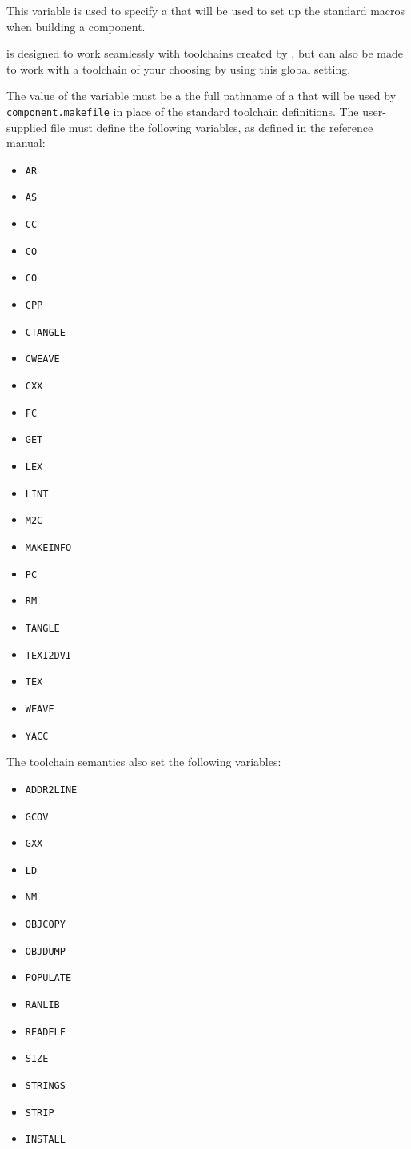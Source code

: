 This variable is used to specify a \gnumake \makefile that will be
used to set up the standard \makefile macros when building a
component.

\lmsbw is designed to work seamlessly with toolchains created by
\ctng, but can also be made to work with a toolchain of your choosing
by using this global setting.

The value of the variable must be a the full pathname of a \makefile
that will be used by \texttt{component.makefile} in place of the
standard \lmsbw toolchain definitions.  The user-supplied file must
define the following variables, as defined in the \gnumake reference
manual:

\begin{itemize}
\item{\texttt{AR}}
\item{\texttt{AS}}
\item{\texttt{CC}}
\item{\texttt{CO}}
\item{\texttt{CO}}
\item{\texttt{CPP}}
\item{\texttt{CTANGLE}}
\item{\texttt{CWEAVE}}
\item{\texttt{CXX}}
\item{\texttt{FC}}
\item{\texttt{GET}}
\item{\texttt{LEX}}
\item{\texttt{LINT}}
\item{\texttt{M2C}}
\item{\texttt{MAKEINFO}}
\item{\texttt{PC}}
\item{\texttt{RM}}
\item{\texttt{TANGLE}}
\item{\texttt{TEXI2DVI}}
\item{\texttt{TEX}}
\item{\texttt{WEAVE}}
\item{\texttt{YACC}}
\end{itemize}

The \ctng toolchain semantics also set the following variables:

\begin{itemize}
\item{\texttt{ADDR2LINE}}
\item{\texttt{GCOV}}
\item{\texttt{GXX}}
\item{\texttt{LD}}
\item{\texttt{NM}}
\item{\texttt{OBJCOPY}}
\item{\texttt{OBJDUMP}}
\item{\texttt{POPULATE}}
\item{\texttt{RANLIB}}
\item{\texttt{READELF}}
\item{\texttt{SIZE}}
\item{\texttt{STRINGS}}
\item{\texttt{STRIP}}
\item{\texttt{INSTALL}}
\end{itemize}


